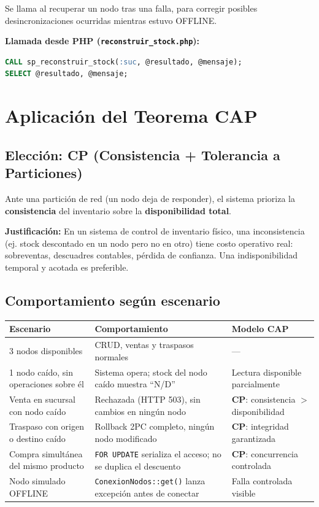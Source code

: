 \documentclass[11pt,a4paper]{article}
\newcommand{\code}[1]{\texttt{#1}}
\begin{document}
Se llama al recuperar un nodo tras una falla, para corregir posibles desincronizaciones ocurridas mientras estuvo OFFLINE.

\textbf{Llamada desde PHP (\code{reconstruir\_stock.php}):}
\begin{lstlisting}[language=SQL]
CALL sp_reconstruir_stock(:suc, @resultado, @mensaje);
SELECT @resultado, @mensaje;
\end{lstlisting}

\newpage
\section{Aplicación del Teorema CAP}

\subsection{Elección: CP (Consistencia + Tolerancia a Particiones)}

Ante una partición de red (un nodo deja de responder), el sistema prioriza la \textbf{consistencia} del inventario sobre la \textbf{disponibilidad total}.

\textbf{Justificación:} En un sistema de control de inventario físico, una inconsistencia (ej. stock descontado en un nodo pero no en otro) tiene costo operativo real: sobreventas, descuadres contables, pérdida de confianza. Una indisponibilidad temporal y acotada es preferible.

\subsection{Comportamiento según escenario}

\begin{table}[h]
\centering
\begin{tabularx}{\textwidth}{@{}X X l@{}}
\toprule
\textbf{Escenario} & \textbf{Comportamiento} & \textbf{Modelo CAP} \\
\midrule
3 nodos disponibles & CRUD, ventas y traspasos normales & --- \\
1 nodo caído, sin operaciones sobre él & Sistema opera; stock del nodo caído muestra ``N/D'' & Lectura disponible parcialmente \\
Venta en sucursal con nodo caído & Rechazada (HTTP 503), sin cambios en ningún nodo & \textbf{CP}: consistencia $>$ disponibilidad \\
Traspaso con origen o destino caído & Rollback 2PC completo, ningún nodo modificado & \textbf{CP}: integridad garantizada \\
Compra simultánea del mismo producto & \code{FOR UPDATE} serializa el acceso; no se duplica el descuento & \textbf{CP}: concurrencia controlada \\
Nodo simulado OFFLINE & \code{ConexionNodos::get()} lanza excepción antes de conectar & Falla controlada visible \\
\bottomrule
\end{tabularx}
\end{table}
\end{document}
